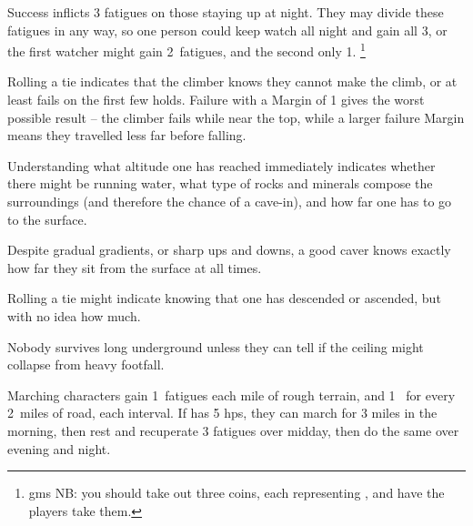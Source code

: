\begin{multicols}{2}
\gatheringChart

Success inflicts 3 \glspl{fatigue} on those staying up at night.
They may divide these \glspl{fatigue} in any way, so one person could keep watch all night and gain all 3, or the first watcher might gain 2~\glspl{fatigue}, and the second only 1.%
\footnote{\Glspl{gm} NB: you should take out three coins, each representing , and have the players take them.}


Rolling a tie indicates that the climber knows they cannot make the climb, or at least fails on the first few holds.
Failure with a Margin of 1 gives the worst possible result -- the climber fails while near the top, while a larger failure Margin means they travelled less far before falling.

Understanding what altitude one has reached immediately indicates whether there might be running water, what type of rocks and minerals compose the surroundings (and therefore the chance of a cave-in), and how far one has to go to the surface.

Despite gradual gradients, or sharp ups and downs, a good caver knows exactly how far they sit from the surface at all times.

Rolling a tie might indicate knowing that one has descended or ascended, but with no idea how much.

Nobody survives long underground unless they can tell if the ceiling might collapse from heavy footfall.


Marching characters gain 1~\glspl{fatigue} each mile of rough terrain, and 1~ for every 2~miles of road, each \gls{interval}.
If  has 5 \glspl{hp}, they can march for 3 miles in the morning, then rest and recuperate 3 \glspl{fatigue} over midday, then do the same over evening and night.


\end{multicols}

